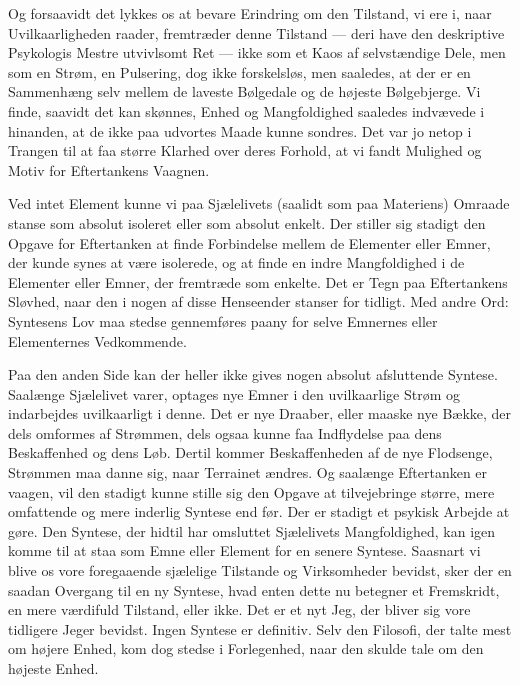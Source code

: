 \documentclass[12pt,a4paper]{book}
\newcommand{\opage}[1]{\marginnote{\footnotesize\textit{[#1]}}}
\newcommand{\apage}[1]{\marginnote{\footnotesize\textit{[#1]}}}
\begin{document}
Og forsaavidt det lykkes os at bevare Erindring om den Tilstand, vi
ere i, naar Uvilkaarligheden raader, fremtræder \apage{13} denne Tilstand --- deri
have den deskriptive Psykologis Mestre utvivlsomt Ret --- ikke som et
Kaos af selvstændige Dele, men som en Strøm, en Pulsering, dog ikke
forskelsløs, men saaledes, at der er en Sammenhæng selv mellem de
laveste Bølgedale og de højeste Bølgebjerge. Vi finde, saavidt det kan
skønnes, Enhed og Mangfoldighed saaledes indvævede i hinanden, at de
ikke paa udvortes Maade kunne sondres. Det var jo netop i Trangen til
at faa større Klarhed over deres Forhold, at vi fandt Mulighed og
Motiv for Eftertankens Vaagnen.

Ved intet Element kunne vi paa Sjælelivets (saalidt som paa Materiens)
Omraade stanse som absolut isoleret eller som absolut enkelt. Der
stiller sig stadigt den Opgave for Eftertanken at finde Forbindelse
mellem de Elementer eller Emner, der kunde synes at være isolerede, og
at finde en indre Mangfoldighed i de Elementer eller Emner, der
fremtræde som enkelte. Det er Tegn paa Eftertankens Sløvhed, naar den
i nogen af disse Henseender stanser for tidligt. Med andre Ord:
Syntesens Lov maa stedse gennemføres paany for selve Emnernes eller
Elementernes Vedkommende.

Paa den anden Side kan der heller ikke gives nogen absolut afsluttende
Syntese. Saalænge Sjælelivet varer, optages nye Emner i den
uvilkaarlige Strøm og indarbejdes uvilkaarligt i denne. Det er nye
Draaber, eller maaske nye Bække, der dels omformes af Strømmen, dels
ogsaa kunne faa Indflydelse paa dens Beskaffenhed og dens Løb. Dertil
kommer Beskaffenheden af de nye Flodsenge, Strømmen maa danne sig,
naar Terrainet ændres. Og saalænge Eftertanken er vaagen, vil den
stadigt kunne stille sig den Opgave at tilvejebringe større, mere
omfattende og mere inderlig Syntese end før. Der er stadigt et psykisk
Arbejde at gøre. Den Syntese, der hidtil har omsluttet Sjælelivets
Mangfoldighed, kan igen komme til at staa som Emne eller Element for en
senere Syntese. Saasnart vi blive os vore foregaaende sjælelige
Tilstande og Virksomheder bevidst, sker der en saadan Overgang til en
ny Syntese, hvad enten dette nu betegner et Fremskridt, en mere
værdifuld Tilstand, eller ikke. Det er et \opage{14} nyt Jeg, der bliver sig vore
tidligere Jeger bevidst. Ingen Syntese er definitiv. Selv den Filosofi,
der talte mest om højere Enhed, kom dog stedse i Forlegenhed, naar den
skulde tale om den højeste Enhed.
\end{document}
